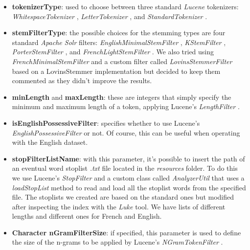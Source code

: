 \begin{itemize}
  \item \textbf{tokenizerType}: used to choose between three standard \textit{Lucene} tokenizers: \textit{WhitespaceTokenizer} \cite{lucenetokenizer}, \textit{LetterTokenizer} \cite{lucenelettertokenizer}, and \textit{StandardTokenizer} \cite{lucenestandardtokenizer}.

  \item \textbf{stemFilterType}: the possible choices for the stemming types are four standard \textit{Apache Solr} \cite{solr} filters: \textit{EnglishMinimalStemFilter} \cite{solrminimalstemfilter}, \textit{KStemFilter} \cite{solrkstemfilter}, \textit{PorterStemFilter} \cite{solrporterstemfilter}, and \textit{FrenchLightStemFilter} \cite{solrfrenchlightstemfilter}.
  We also tried using \textit{FrenchMinimalStemFilter} \cite{solrfrenchminimalstemfilter} and a custom filter called \textit{LovinsStemmerFilter} based on a LovinsStemmer \cite{lucenelovinsstemmer} implementation but decided to keep them commented as they didn't improve the results.

  \item \textbf{minLength} and \textbf{maxLength}: these are integers that simply specify the minimum and maximum length of a token, applying Lucene's \textit{LengthFilter} \cite{lucenelengthfilter}.

  \item \textbf{isEnglishPossessiveFilter}: specifies whether to use Lucene's \textit{EnglishPossessiveFilter} \cite{luceneenglishpossessivefilter} or not.
  Of course, this can be useful when operating with the English dataset.

  \item \textbf{stopFilterListName}: with this parameter, it's possible to insert the path of an eventual word stoplist \textit{.txt} file located in the \textit{resources} folder.
  To do this we use Lucene's \textit{StopFilter} \cite{lucenestopfilter} and a custom class called \textit{AnalyzerUtil} that uses a \textit{loadStopList} method to read and load all the stoplist words from the specified file.
  The stoplists we created are based on the standard ones but modified after inspecting the index with the \textit{Luke} \cite{luke} tool.
  We have lists of different lengths and different ones for French and English.

  \item \textbf{Character nGramFilterSize}: if specified, this parameter is used to define the size of the n-grams to be applied by Lucene's \textit{NGramTokenFilter} \cite{lucenengramtokenfilter}.


\end{itemize}
